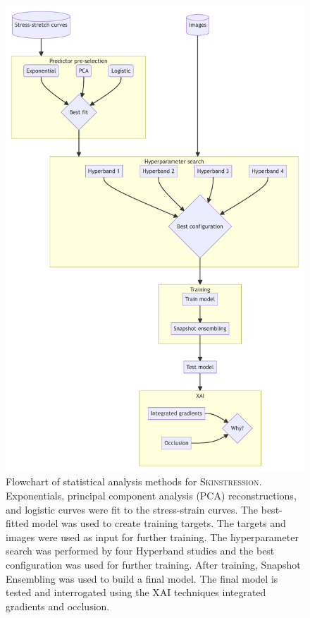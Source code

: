 \begin{figure}[p]
    \centering
    \includegraphics[height=\dimexpr\textheight-55.89pt\relax]{mermaid/skin_analysis.pdf}
    \caption[Flowchart of statistical analysis methods for \textsc{Skinstression}]{
        Flowchart of statistical analysis methods for \textsc{Skinstression}.
        Exponentials, principal component analysis (PCA) reconstructions, and logistic curves were fit to the stress-strain curves.
        The best-fitted model was used to create training targets.
        The targets and images were used as input for further training.
        The hyperparameter search was performed by four Hyperband studies and the best configuration was used for further training.
        After training, Snapshot Ensembling was used to build a final model.
        The final model is tested and interrogated using the XAI techniques integrated gradients and occlusion.
    }
    \label{fig:skin_stat_methods}
\end{figure}

